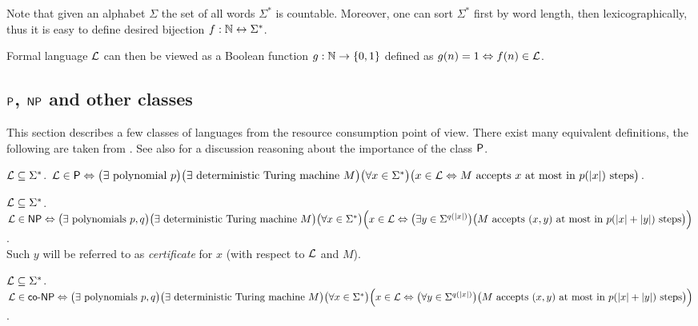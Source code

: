 		\begin{remark}
			Note that given an alphabet $\Sigma$ the set of all words $\Sigma^*$ is countable. Moreover, one can sort $\Sigma^*$ first by word length, then lexicographically, thus it is easy to define desired bijection $f: \N \leftrightarrow \Sigma^* $.
			
			Formal language ${\cal L}$ can then be viewed as a Boolean function $g: \N \rightarrow \{0,1\}$ defined as
			$g(n) = 1 \iff f(n)\in {\cal L}$.
		\end{remark}
	
	\subsection{$\P$, $\NP$ and other classes}
	\label{sec:PNP}
		
		This section describes a few classes of languages from the resource consumption point of view. There exist many equivalent definitions, the following are taken from \cite{book_comp}. See also \cite[Chapter 1.5.1]{book_comp} for a discussion reasoning about the importance of the class $\P$.
		
		\begin{defn}\label{def:P}
			${\cal L} \subseteq \Sigma^*$. ${\cal L} \in \P \iff \bigl(\exists \textnormal{ polynomial } p \bigr) \bigl(\exists \textnormal{ deterministic Turing machine } M\bigr)\\ \bigl(\forall x \in \Sigma^*\bigr) \bigl(x \in {\cal L} \iff M \textnormal{ accepts } x \textnormal{ at most in } p(|x|) \textnormal{ steps} \bigr)$.
		\end{defn}
		
		\begin{defn}\label{def:NP}
			${\cal L} \subseteq \Sigma^*$. ${\cal L} \in \NP \iff \bigl(\exists \textnormal{ polynomials } p, q \bigr) \bigl(\exists \textnormal{ deterministic Turing machine } M\bigr)\\ \bigl(\forall x \in \Sigma^*\bigr) \Bigl(x \in {\cal L} \iff \bigl(\exists y \in \Sigma^{q(|x|)}\bigr) \bigl(M \textnormal{ accepts } (x,y) \textnormal{ at most in } p(|x|+|y|) \textnormal{ steps} \bigr)\Bigr)$.\\
			Such $y$ will be referred to as {\em certificate} for $x$ (with respect to $\cal L$ and $M$).
		\end{defn}
		
		\begin{defn}\label{def:coNP}
			${\cal L} \subseteq \Sigma^*$. ${\cal L} \in \coNP \iff \bigl(\exists \textnormal{ polynomials } p, q \bigr) \bigl(\exists \textnormal{ deterministic Turing machine } M\bigr)\\ \bigl(\forall x \in \Sigma^*\bigr) \Bigl(x \in {\cal L} \iff \bigl(\forall y \in \Sigma^{q(|x|)}\bigr) \bigl(M \textnormal{ accepts } (x,y) \textnormal{ at most in } p(|x|+|y|) \textnormal{ steps} \bigr)\Bigr)$.
		\end{defn}
		
